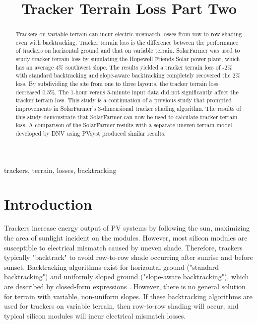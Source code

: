 \documentclass[conference]{IEEEtran}
\begin{document}
\title{Tracker Terrain Loss Part Two}

\author{
	}

\maketitle

\begin{abstract}
Trackers on variable terrain can incur electric mismatch losses from row-to-row shading even with backtracking. Tracker terrain loss is the difference between the performance of trackers on horizontal ground and that on variable terrain. SolarFarmer was used to study tracker terrain loss by simulating the Hopewell Friends Solar power plant, which has an average 4\% southwest slope. The results yielded a tracker terrain loss of -2\% with standard backtracking and slope-aware backtracking completely recovered the 2\% loss. By subdividing the site from one to three layouts, the tracker terrain loss decreased 0.5\%. The 1-hour versus 5-minute input data did not significantly affect the tracker terrain loss. This study is a continuation of a previous study that prompted improvements in SolarFarmer's 3-dimensional tracker shading algorithm. The results of this study demonstrate that SolarFarmer can now be used to calculate tracker terrain loss. A comparison of the SolarFarmer results with a separate uneven terrain model developed by DNV using PVsyst produced similar results.
\end{abstract}

\begin{IEEEkeywords}
trackers, terrain, losses, backtracking
\end{IEEEkeywords}

\section{Introduction}
Trackers increase energy output of PV systems by following the sun, maximizing the area of sunlight incident on the modules. However, most silicon modules are susceptible to electrical mismatch caused by uneven shade. Therefore, trackers typically "backtrack" to avoid  row-to-row shade occurring after sunrise and before sunset. Backtracking algorithms exist for horizontal ground ("standard backtracking") and uniformly sloped ground ("slope-aware backtracking"), which are described by closed-form expressions \cite{Marion2013,Anderson2020}. However, there is no general solution for terrain with variable, non-uniform slopes. If these backtracking algorithms are used for trackers on variable terrain, then row-to-row shading will occur, and typical silicon modules will incur electrical mismatch losses. 
\end{document}
